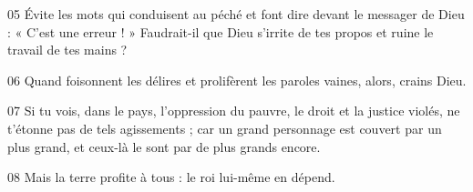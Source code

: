
05 Évite les mots qui conduisent au péché et font dire devant le messager de Dieu : « C’est une erreur ! » Faudrait-il que Dieu s’irrite de tes propos et ruine le travail de tes mains ?

06 Quand foisonnent les délires et prolifèrent les paroles vaines, alors, crains Dieu.

07 Si tu vois, dans le pays, l’oppression du pauvre, le droit et la justice violés, ne t’étonne pas de tels agissements ; car un grand personnage est couvert par un plus grand, et ceux-là le sont par de plus grands encore.

08 Mais la terre profite à tous : le roi lui-même en dépend.
